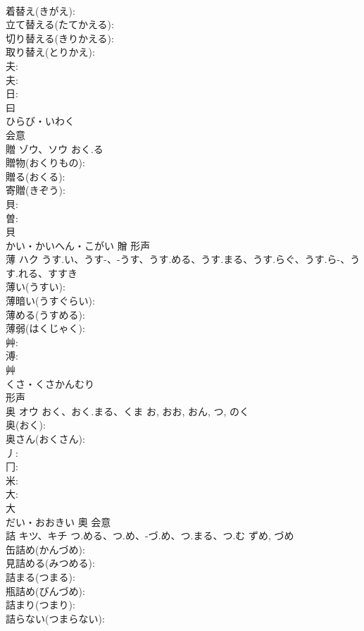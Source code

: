 \documentclass[8pt]{extreport}
\begin{document}
\begin{CJK}{UTF8}{min}
\\	着替え(きがえ): 
\\	立て替える(たてかえる): 
\\	切り替える(きりかえる): 
\\	取り替え(とりかえ): 
\\	夫: 
\\	夫: 
\\	日: 
\\	曰	
\\	ひらび・いわく	
\\	会意 
\\	贈	ゾウ、ソウ	おく.る		
\\	贈物(おくりもの): 
\\	贈る(おくる): 
\\	寄贈(きぞう): 
\\	貝: 
\\	曽: 
\\	貝	
\\	かい・かいへん・こがい	贈	形声 
\\	薄	ハク	うす.い、うす-、-うす、うす.める、うす.まる、うす.らぐ、うす.ら-、うす.れる、すすき		
\\	薄い(うすい): 
\\	薄暗い(うすぐらい): 
\\	薄める(うすめる): 
\\	薄弱(はくじゃく): 
\\	艸: 
\\	溥: 
\\	艸	
\\	くさ・くさかんむり	
\\	形声 
\\	奥	オウ	おく、おく.まる、くま	お, おお, おん, つ, のく	
\\	奥(おく): 
\\	奥さん(おくさん): 
\\	丿: 
\\	冂: 
\\	米: 
\\	大: 
\\	大	
\\	だい・おおきい	奧	会意 
\\	詰	キツ、キチ	つ.める、つ.め、-づ.め、つ.まる、つ.む	ずめ, づめ	
\\	缶詰め(かんづめ): 
\\	見詰める(みつめる): 
\\	詰まる(つまる): 
\\	瓶詰め(びんづめ): 
\\	詰まり(つまり): 
\\	詰らない(つまらない): 

\end{CJK}
\end{document}
